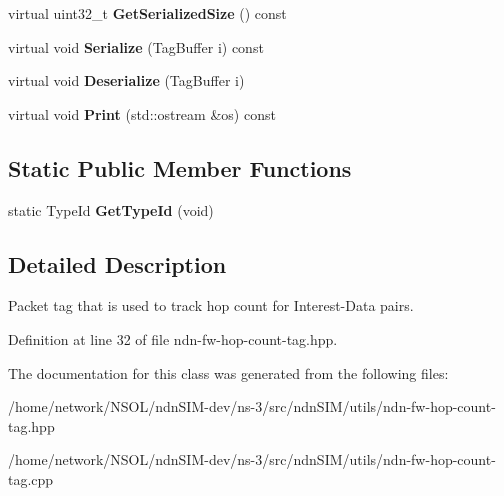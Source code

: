 \begin{DoxyCompactItemize}
\item 
virtual uint32\+\_\+t {\bfseries Get\+Serialized\+Size} () const\hypertarget{classns3_1_1ndn_1_1FwHopCountTag_ae35f0a2edead40e592317a8a81b93d2d}{}\label{classns3_1_1ndn_1_1FwHopCountTag_ae35f0a2edead40e592317a8a81b93d2d}

\item 
virtual void {\bfseries Serialize} (Tag\+Buffer i) const\hypertarget{classns3_1_1ndn_1_1FwHopCountTag_aa4ac564b5ba734c6c5206255f629a958}{}\label{classns3_1_1ndn_1_1FwHopCountTag_aa4ac564b5ba734c6c5206255f629a958}

\item 
virtual void {\bfseries Deserialize} (Tag\+Buffer i)\hypertarget{classns3_1_1ndn_1_1FwHopCountTag_ac868b16e97cfdace940d95d46495fba7}{}\label{classns3_1_1ndn_1_1FwHopCountTag_ac868b16e97cfdace940d95d46495fba7}

\item 
virtual void {\bfseries Print} (std\+::ostream \&os) const\hypertarget{classns3_1_1ndn_1_1FwHopCountTag_aa235047435e18fa09d4453abd98dde45}{}\label{classns3_1_1ndn_1_1FwHopCountTag_aa235047435e18fa09d4453abd98dde45}

\end{DoxyCompactItemize}
\subsection*{Static Public Member Functions}
\begin{DoxyCompactItemize}
\item 
static Type\+Id {\bfseries Get\+Type\+Id} (void)\hypertarget{classns3_1_1ndn_1_1FwHopCountTag_ab87861eb70dbbd6c39005011c22f2c86}{}\label{classns3_1_1ndn_1_1FwHopCountTag_ab87861eb70dbbd6c39005011c22f2c86}

\end{DoxyCompactItemize}


\subsection{Detailed Description}
Packet tag that is used to track hop count for Interest-\/\+Data pairs. 

Definition at line 32 of file ndn-\/fw-\/hop-\/count-\/tag.\+hpp.



The documentation for this class was generated from the following files\+:\begin{DoxyCompactItemize}
\item 
/home/network/\+N\+S\+O\+L/ndn\+S\+I\+M-\/dev/ns-\/3/src/ndn\+S\+I\+M/utils/ndn-\/fw-\/hop-\/count-\/tag.\+hpp\item 
/home/network/\+N\+S\+O\+L/ndn\+S\+I\+M-\/dev/ns-\/3/src/ndn\+S\+I\+M/utils/ndn-\/fw-\/hop-\/count-\/tag.\+cpp\end{DoxyCompactItemize}
